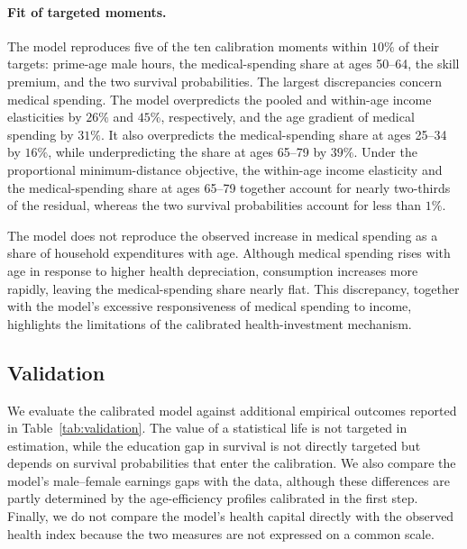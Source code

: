 \documentclass[12pt,a4paper]{article}
\begin{document}
\paragraph{Fit of targeted moments.}
The model reproduces five of the ten calibration moments within $10\%$ of their targets: prime-age male hours, the medical-spending share at ages 50--64, the skill premium, and the two survival probabilities. The largest discrepancies concern medical spending. The model overpredicts the pooled and within-age income elasticities by $26\%$ and $45\%$, respectively, and the age gradient of medical spending by $31\%$. It also overpredicts the medical-spending share at ages 25--34 by $16\%$, while underpredicting the share at ages 65--79 by $39\%$. Under the proportional minimum-distance objective, the within-age income elasticity and the medical-spending share at ages 65--79 together account for nearly two-thirds of the residual, whereas the two survival probabilities account for less than $1\%$.

The model does not reproduce the observed increase in medical spending as a share of household expenditures with age. Although medical spending rises with age in response to higher health depreciation, consumption increases more rapidly, leaving the medical-spending share nearly flat. This discrepancy, together with the model's excessive responsiveness of medical spending to income, highlights the limitations of the calibrated health-investment mechanism.


\subsection{Validation}
\label{subsec:validation}

We evaluate the calibrated model against additional empirical outcomes reported in Table~\ref{tab:validation}. The value of a statistical life is not targeted in estimation, while the education gap in survival is not directly targeted but depends on survival probabilities that enter the calibration. We also compare the model's male--female earnings gaps with the data, although these differences are partly determined by the age-efficiency profiles calibrated in the first step. Finally, we do not compare the model's health capital directly with the observed health index because the two measures are not expressed on a common scale.
\end{document}
